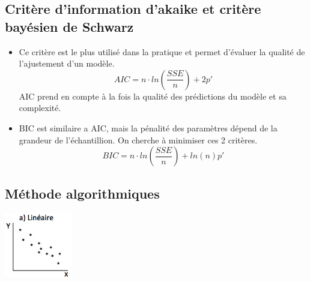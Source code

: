\documentclass[10pt, french]{article}
\begin{document}
\begin{multicols*}{3}
\subsection*{Critère d'information d'akaike et critère bayésien de Schwarz}
\begin{itemize}
\item Ce critère est le plus utilisé dans la pratique et permet d'évaluer la qualité de l'ajustement d'un modèle. 
\[ AIC = n \cdot ln\left(\frac{SSE}{n}\right) + 2p' \]
AIC prend en compte à la fois la qualité des prédictions du modèle et sa complexité.
\item BIC est similaire a AIC, mais la pénalité des paramètres dépend de la grandeur de l'échantillion.
On cherche à minimiser ces 2 critères.
\[ BIC = n \cdot ln\left(\frac{SSE}{n}\right) + ln(n)p' \]
\end{itemize}





\subsection*{Méthode algorithmiques}
\includegraphics[width=3cm]{graphique_residus/lineaire1.png}






\end{multicols*}
\end{document}

